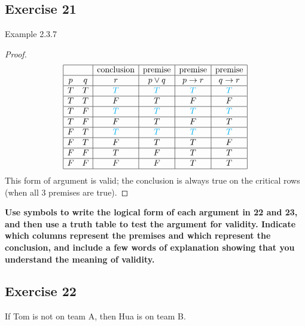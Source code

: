 \documentclass[14pt]{extarticle}
\begin{document}
\subsection{Exercise 21}
Example 2.3.7

\begin{proof}
    $$
        \begin{array}{|cc|c|c|c|c|}
            \hline
              &   & \text{conclusion} & \text{premise} & \text{premise} & \text{premise} \\
            \hline
            p & q & r                 & p \vee q       & p \to r        & q \to r        \\
            \hline
            T & T & \color{cyan} T    & \color{cyan} T & \color{cyan} T & \color{cyan} T \\
            \hline
            T & T & F                 & T              & F              & F              \\
            \hline
            T & F & \color{cyan} T    & \color{cyan} T & \color{cyan} T & \color{cyan} T \\
            \hline
            T & F & F                 & T              & F              & T              \\
            \hline
            F & T & \color{cyan} T    & \color{cyan} T & \color{cyan} T & \color{cyan} T \\
            \hline
            F & T & F                 & T              & T              & F              \\
            \hline
            F & F & T                 & F              & T              & T              \\
            \hline
            F & F & F                 & F              & T              & T              \\
            \hline
        \end{array}
    $$
    This form of argument is valid; the conclusion is always true on the critical rows (when all 3 premises are true).
\end{proof}

{\bf \color{cyan} Use symbols to write the logical form of each argument in 22 and 23, and then use a truth table to test the argument for validity. Indicate which columns represent the premises and which represent the conclusion, and include a few words of explanation showing that you understand the meaning of
validity.}

\subsection{Exercise 22}
If Tom is not on team A, then Hua is on team B.
\end{document}
